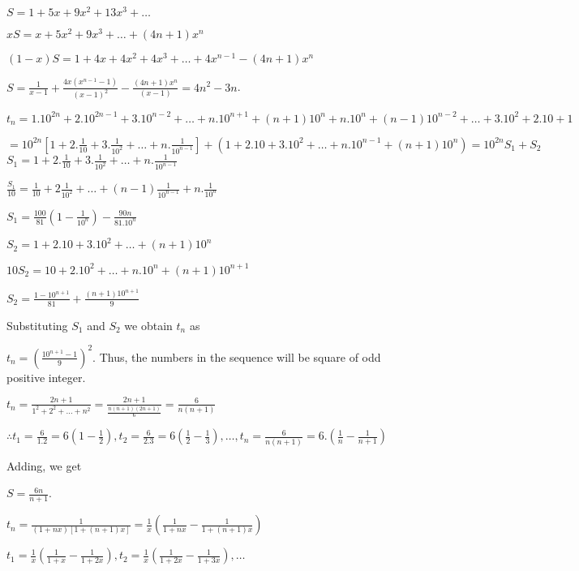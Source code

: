   $S = 1 + 5x + 9x^2 + 13x^3 + \ldots$

  $xS = x + 5x^2 + 9x^3 + \ldots + (4n + 1)x^n$

  $(1 - x)S = 1 + 4x + 4x^2 + 4x^3 + \ldots + 4x^{n - 1} - (4n + 1)x^n$

  $S = \frac{1}{x - 1} + \frac{4x(x^{n - 1} - 1)}{(x - 1)^2} - \frac{(4n + 1)x^n}{(x - 1)} = 4n^2 - 3n$.
\item $t_n = 1.10^{2n} + 2.10^{2n - 1} + 3.10^{n - 2} + \ldots + n.10^{n + 1} + (n + 1)10^n + n.10^n + (n -
  1)10^{n - 2} + \ldots + 3.10^2 + 2.10 + 1$

  $= 10^{2n}\left[1 + 2.\frac{1}{10} + 3.\frac{1}{10^2} + \ldots + n.\frac{1}{10^{n - 1}}\right] + (1 + 2.10
  + 3.10^2 + \ldots + n.10^{n - 1} + (n + 1)10^n) = 10^{2n}S_1 + S_2$
  $S_1 = 1 + 2.\frac{1}{10} + 3.\frac{1}{10^2} + \ldots + n.\frac{1}{10^{n - 1}}$

  $\frac{S_1}{10} = \frac{1}{10} + 2\frac{1}{10^2} + \ldots + (n - 1)\frac{1}{10^{n - 1}} +
  n.\frac{1}{10^n}$

  $S_1 = \frac{100}{81}\left(1 - \frac{1}{10^n}\right) - \frac{90n}{81.10^n}$

  $S_2 = 1 + 2.10 + 3.10^2 + \ldots + (n + 1)10^n$

  $10S_2 = 10 + 2.10^2 + \ldots + n.10^n + (n + 1)10^{n + 1}$

  $S_2 = \frac{1 - 10^{n + 1}}{81} + \frac{(n + 1)10^{n + 1}}{9}$

  Substituting $S_1$ and $S_2$ we obtain $t_n$ as

  $t_n = \left(\frac{10^{n + 1} - 1}{9}\right)^2$. Thus, the numbers in the sequence will be square of odd
  positive integer.
\item $t_n = \frac{2n + 1}{1^2 + 2^2 + \ldots + n^2} = \frac{2n + 1}{\frac{n(n + 1)(2n + 1)}{6}} =
  \frac{6}{n(n + 1)}$

  $\therefore t_1 = \frac{6}{1.2} = 6\left(1 - \frac{1}{2}\right), t_2 = \frac{6}{2.3} = 6\left(\frac{1}{2} -
  \frac{1}{3}\right), \ldots, t_n = \frac{6}{n(n + 1)} = 6.\left(\frac{1}{n} - \frac{1}{n + 1}\right)$

  Adding, we get

  $S = \frac{6n}{n + 1}$.
\item $t_n = \frac{1}{(1 + nx)[1 + (n + 1)x]} = \frac{1}{x}\left(\frac{1}{1 + nx} - \frac{1}{1 + (n +
  1)x}\right)$

  $t_1 = \frac{1}{x}\left(\frac{1}{1 + x} - \frac{1}{1 + 2x}\right), t_2 = \frac{1}{x}\left(\frac{1}{1 + 2x}
  - \frac{1}{1 + 3x}\right), \ldots$

